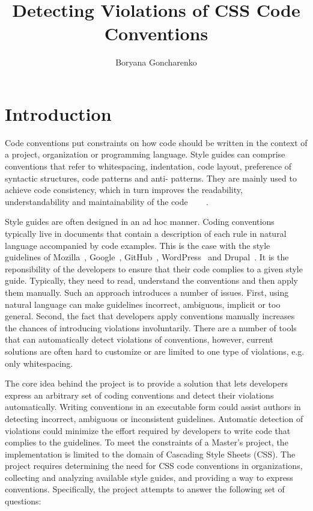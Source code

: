 \documentclass[parskip=full]{uvamscse}
\title{Detecting Violations of CSS Code Conventions}
\author{Boryana Goncharenko}
\begin{document}
\maketitle

\chapter{Introduction}

Code conventions put constraints on how code should be written in the context of a project,
organization or programming language. Style guides can comprise conventions that refer to
whitespacing, indentation, code layout, preference of syntactic structures, code patterns and anti-
patterns. They are mainly used to achieve code consistency, which in turn improves the readability,
understandability and maintainability of the code~\cite{Buse2010} ~\cite{buse2010learning}
~\cite{tenny1988program}.

Style guides are often designed in an ad hoc manner. Coding conventions typically live in documents
that contain a description of each rule in natural language accompanied by code examples. This is
the case with the style guidelines of Mozilla~\cite{Mozilla}, Google~\cite{Google},
GitHub~\cite{GitHub}, WordPress~\cite{Wordpress} and Drupal~\cite{Drupal}. It is the reponsibility
of the developers to ensure that their code complies to a given style guide. Typically, they need to
read, understand the conventions and then apply them manually. Such an approach introduces a number
of issues. First, using natural language can make guidelines incorrect, ambiguous, implicit or too
general. Second, the fact that developers apply conventions manually increases the chances of
introducing violations involuntarily. There are a number of tools that can automatically detect
violations of conventions, however, current solutions are often hard to customize or are limited to
one type of violations, e.g. only whitespacing.

The core idea behind the project is to provide a solution that lets developers express an arbitrary
set of coding conventions and detect their violations automatically. Writing conventions
in an executable form could assist authors in detecting incorrect, ambiguous or inconsistent
guidelines. Automatic detection of violations could minimize the effort required by developers to
write code that complies to the guidelines. To meet the constraints of a Master’s project, the
implementation is limited to the domain of Cascading Style Sheets (CSS). The project requires
determining the need for CSS code conventions in organizations, collecting and analyzing available
style guides, and providing a way to express conventions. Specifically, the project attempts to
answer the following set of questions:
\end{document}
